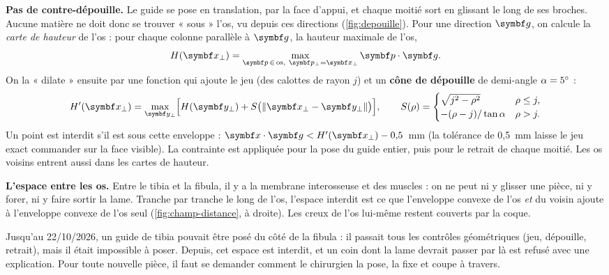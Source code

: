 \textbf{Pas de contre-dépouille.} Le guide se pose en translation, par la face d'appui, et chaque moitié sort en
glissant le long de ses broches. Aucune matière ne doit donc se trouver « sous » l'os, vu depuis ces directions
(\cref{fig:depouille}). Pour une direction $\vb{g}$, on calcule la \emph{carte de hauteur} de l'os : pour chaque colonne
parallèle à $\vb{g}$, la hauteur maximale de l'os,
\begin{equation}
  H(\vb{x}_\perp) = \max_{\vb{p}\,\in\,\text{os},\ \vb{p}_\perp = \vb{x}_\perp} \vb{p}\cdot\vb{g}.
\end{equation}
On la « dilate » ensuite par une fonction qui ajoute le jeu (des calottes de rayon $j$) et un \textbf{cône de
dépouille} de demi-angle $\alpha = 5^\circ$ :
\begin{equation}
  H'(\vb{x}_\perp) = \max_{\vb{y}_\perp}\Bigl[H(\vb{y}_\perp) + S\bigl(\norm{\vb{x}_\perp - \vb{y}_\perp}\bigr)\Bigr],
  \qquad
  S(\rho) = \begin{cases} \sqrt{j^2 - \rho^2} & \rho \leq j, \\ -(\rho - j)/\tan\alpha & \rho > j. \end{cases}
\end{equation}
Un point est interdit s'il est sous cette enveloppe : $\vb{x}\cdot\vb{g} < H'(\vb{x}_\perp) - 0{,}5$~mm (la tolérance de
0,5~mm laisse le jeu exact commander sur la face visible). La contrainte est appliquée pour la pose du guide entier,
puis pour le retrait de chaque moitié. Les os voisins entrent aussi dans les cartes de hauteur.


\textbf{L'espace entre les os.} Entre le tibia et la fibula, il y a la membrane interosseuse et des muscles : on ne
peut ni y glisser une pièce, ni y forer, ni y faire sortir la lame. Tranche par tranche le long de l'os, l'espace
interdit est ce que l'enveloppe convexe de l'os \emph{et} du voisin ajoute à l'enveloppe convexe de l'os seul
(\cref{fig:champ-distance}, à droite). Les creux de l'os lui-même restent couverts par la coque.

\begin{attention}[title={Une erreur corrigée grâce au chirurgien}]
Jusqu'au 22/10/2026, un guide de tibia pouvait être posé du côté de la fibula : il passait tous les contrôles
géométriques (jeu, dépouille, retrait), mais il était impossible à poser. Depuis, cet espace est interdit, et un coin
dont la lame devrait passer par là est refusé avec une explication. Pour toute nouvelle pièce, il faut se demander
comment le chirurgien la pose, la fixe et coupe à travers.
\end{attention}

